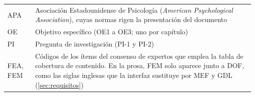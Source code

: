 \begin{longtable}{@{}p{2.4cm}p{11.4cm}@{}}
APA & Asociación Estadounidense de Psicología (\emph{American Psychological Association}), cuyas normas rigen la presentación del documento \\
OE & Objetivo específico (OE1 a OE3; uno por capítulo) \\
PI & Pregunta de investigación (PI-1 y PI-2) \\
FEA, FEM & Códigos de los ítems del consenso de expertos que emplea la tabla de cobertura de contenido. En la prosa, FEM solo aparece junto a DOF, como las siglas inglesas que la interfaz sustituye por MEF y GDL (\autoref{sec:requisitos}) \\
\end{longtable}
\renewcommand{\arraystretch}{1.0}

\setcounter{table}{0}
\clearpage
\endgroup
